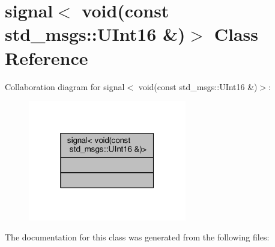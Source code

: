 \hypertarget{classboost_1_1signals2_1_1signal_3_01void_07const_01std__msgs_1_1UInt16_01_6_08_4}{}\section{signal$<$ void(const std\+\_\+msgs\+:\+:U\+Int16 \&)$>$ Class Reference}
\label{classboost_1_1signals2_1_1signal_3_01void_07const_01std__msgs_1_1UInt16_01_6_08_4}


Collaboration diagram for signal$<$ void(const std\+\_\+msgs\+:\+:U\+Int16 \&)$>$\+:
\nopagebreak
\begin{figure}[H]
\begin{center}
\leavevmode
\includegraphics[width=196pt]{classboost_1_1signals2_1_1signal_3_01void_07const_01std__msgs_1_1UInt16_01_6_08_4__coll__graph}
\end{center}
\end{figure}


The documentation for this class was generated from the following files\+: